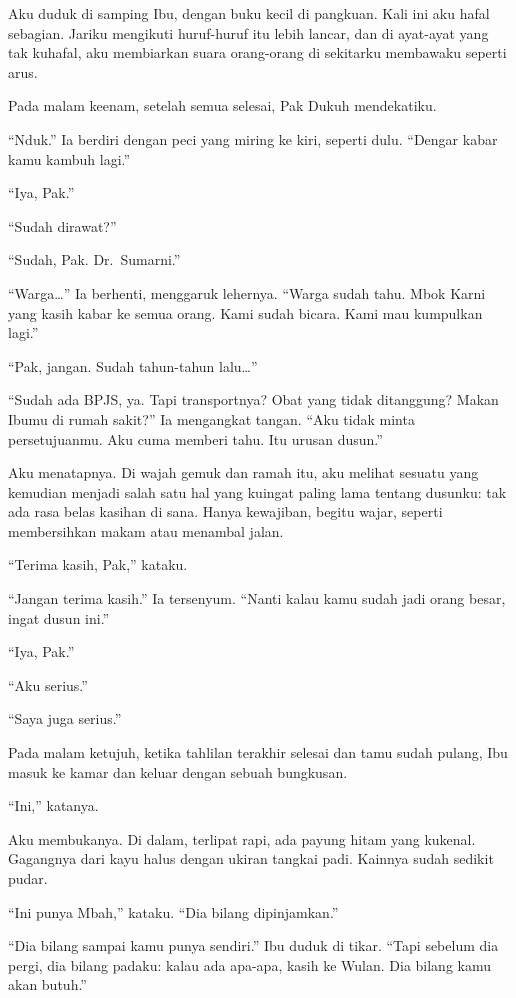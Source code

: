 \documentclass[11pt,twoside,openany]{book}
\makeatletter
\newcommand{\scenebreak}{\par\vspace{0.9em}{\centering\textsc{*\hspace{0.7em}*\hspace{0.7em}*}\par}\vspace{0.9em}\@afterindentfalse\@afterheading}
\makeatother
\begin{document}
Aku duduk di samping Ibu, dengan buku kecil di pangkuan. Kali ini aku hafal sebagian. Jariku mengikuti huruf-huruf itu lebih lancar, dan di ayat-ayat yang tak kuhafal, aku membiarkan suara orang-orang di sekitarku membawaku seperti arus.

Pada malam keenam, setelah semua selesai, Pak Dukuh mendekatiku.

``Nduk.'' Ia berdiri dengan peci yang miring ke kiri, seperti dulu. ``Dengar kabar kamu kambuh lagi.''

``Iya, Pak.''

``Sudah dirawat?''

``Sudah, Pak. Dr.~Sumarni.''

``Warga\ldots{}'' Ia berhenti, menggaruk lehernya. ``Warga sudah tahu. Mbok Karni yang kasih kabar ke semua orang. Kami sudah bicara. Kami mau kumpulkan lagi.''

``Pak, jangan. Sudah tahun-tahun lalu\ldots{}''

``Sudah ada BPJS, ya. Tapi transportnya? Obat yang tidak ditanggung? Makan Ibumu di rumah sakit?'' Ia mengangkat tangan. ``Aku tidak minta persetujuanmu. Aku cuma memberi tahu. Itu urusan dusun.''

Aku menatapnya. Di wajah gemuk dan ramah itu, aku melihat sesuatu yang kemudian menjadi salah satu hal yang kuingat paling lama tentang dusunku: tak ada rasa belas kasihan di sana. Hanya kewajiban, begitu wajar, seperti membersihkan makam atau menambal jalan.

``Terima kasih, Pak,'' kataku.

``Jangan terima kasih.'' Ia tersenyum. ``Nanti kalau kamu sudah jadi orang besar, ingat dusun ini.''

``Iya, Pak.''

``Aku serius.''

``Saya juga serius.''

\scenebreak
Pada malam ketujuh, ketika tahlilan terakhir selesai dan tamu sudah pulang, Ibu masuk ke kamar dan keluar dengan sebuah bungkusan.

``Ini,'' katanya.

Aku membukanya. Di dalam, terlipat rapi, ada payung hitam yang kukenal. Gagangnya dari kayu halus dengan ukiran tangkai padi. Kainnya sudah sedikit pudar.

``Ini punya Mbah,'' kataku. ``Dia bilang dipinjamkan.''

``Dia bilang sampai kamu punya sendiri.'' Ibu duduk di tikar. ``Tapi sebelum dia pergi, dia bilang padaku: kalau ada apa-apa, kasih ke Wulan. Dia bilang kamu akan butuh.''
\end{document}
